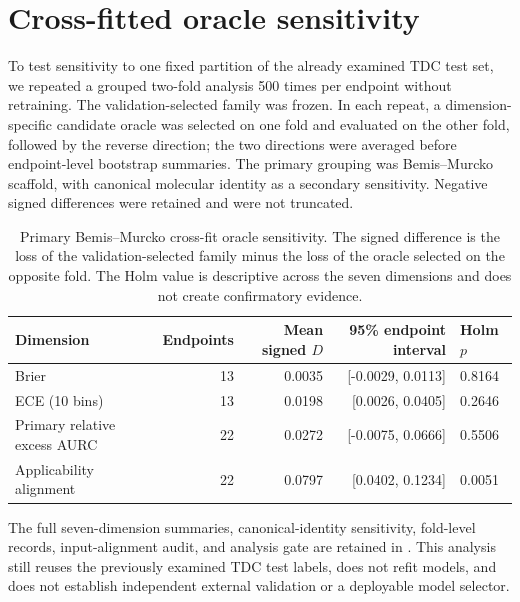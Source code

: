 \documentclass[11pt]{article}
\begin{document}
\section{Cross-fitted oracle sensitivity}
To test sensitivity to one fixed partition of the already examined TDC test
set, we repeated a grouped two-fold analysis 500 times per endpoint without
retraining. The validation-selected family was frozen. In each repeat, a
dimension-specific candidate oracle was selected on one fold and evaluated on
the other fold, followed by the reverse direction; the two directions were
averaged before endpoint-level bootstrap summaries. The primary grouping was
Bemis--Murcko scaffold, with canonical molecular identity as a secondary
sensitivity. Negative signed differences were retained and were not truncated.

\begin{table}[ht]
\centering
\begin{tabular}{lrrrl}
\toprule
Dimension & Endpoints & Mean signed $D$ & 95\% endpoint interval & Holm $p$ \\
\midrule
Brier & 13 & 0.0035 & [-0.0029, 0.0113] & 0.8164 \\
ECE (10 bins) & 13 & 0.0198 & [0.0026, 0.0405] & 0.2646 \\
Primary relative excess AURC & 22 & 0.0272 & [-0.0075, 0.0666] & 0.5506 \\
Applicability alignment & 22 & 0.0797 & [0.0402, 0.1234] & 0.0051 \\
\bottomrule
\end{tabular}
\caption{Primary Bemis--Murcko cross-fit oracle sensitivity. The signed
difference is the loss of the validation-selected family minus the loss of the
oracle selected on the opposite fold. The Holm value is descriptive across the
seven dimensions and does not create confirmatory evidence.}
\end{table}

The full seven-dimension summaries, canonical-identity sensitivity, fold-level
records, input-alignment audit, and analysis gate are retained in
. This analysis
still reuses the previously examined TDC test labels, does not refit models,
and does not establish independent external validation or a deployable model
selector.
\end{document}
